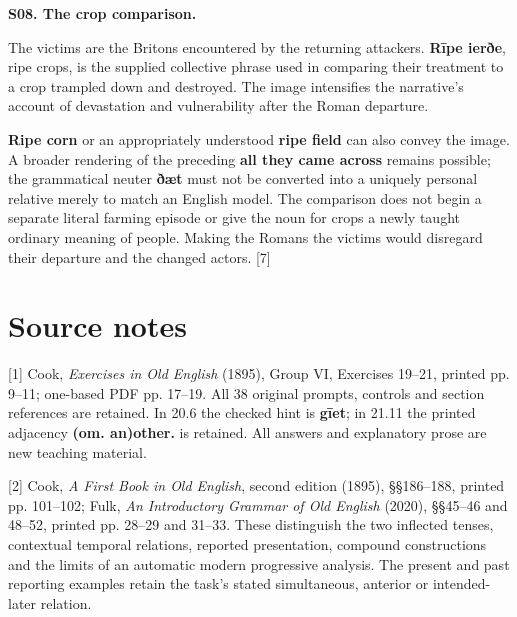 \par\begin{minipage}{\linewidth}\raggedright
\textbf{S08. The crop comparison.}

The victims are the Britons encountered by the returning attackers. \textbf{Rīpe ierðe}, ripe crops, is the supplied collective phrase used in comparing their treatment to a crop trampled down and destroyed. The image intensifies the narrative's account of devastation and vulnerability after the Roman departure.

\textbf{Ripe corn} or an appropriately understood \textbf{ripe field} can also convey the image. A broader rendering of the preceding \textbf{all they came across} remains possible; the grammatical neuter \textbf{ðæt} must not be converted into a uniquely personal relative merely to match an English model. The comparison does not begin a separate literal farming episode or give the noun for crops a newly taught ordinary meaning of people. Making the Romans the victims would disregard their departure and the changed actors. [7]

\end{minipage}\par\addvspace{4pt}

\clearpage
\section*{Source notes}

\begingroup\fontsize{10}{12.8}\selectfont
[1] Cook, \emph{Exercises in Old English} (1895), Group VI, Exercises 19–21, printed pp. 9–11; one-based PDF pp. 17–19. All 38 original prompts, controls and section references are retained. In 20.6 the checked hint is \textbf{gīet}; in 21.11 the printed adjacency \textbf{(om. an)other.} is retained. All answers and explanatory prose are new teaching material.

[2] Cook, \emph{A First Book in Old English}, second edition (1895), §§186–188, printed pp. 101–102; Fulk, \emph{An Introductory Grammar of Old English} (2020), §§45–46 and 48–52, printed pp. 28–29 and 31–33. These distinguish the two inflected tenses, contextual temporal relations, reported presentation, compound constructions and the limits of an automatic modern progressive analysis. The present and past reporting examples retain the task's stated simultaneous, anterior or intended-later relation.

